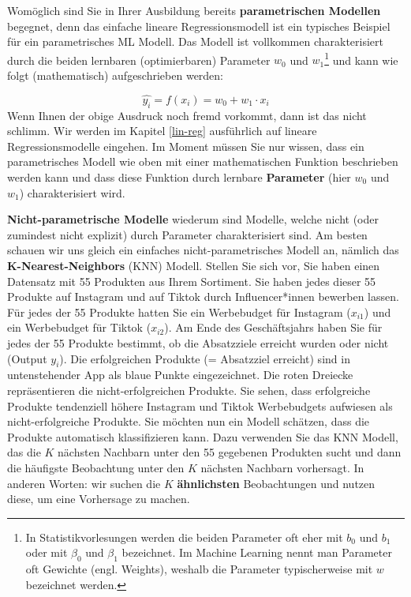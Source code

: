 \documentclass[
]{book}
\begin{document}
Womöglich sind Sie in Ihrer Ausbildung bereits \textbf{parametrischen Modellen} begegnet, denn das einfache lineare Regressionsmodell ist ein typisches Beispiel für ein parametrisches ML Modell. Das Modell ist vollkommen charakterisiert durch die beiden lernbaren (optimierbaren) Parameter \(w_0\) und \(w_1\)\footnote{In Statistikvorlesungen werden die beiden Parameter oft eher mit \(b_0\) und \(b_1\) oder mit \(\beta_0\) und \(\beta_1\) bezeichnet. Im Machine Learning nennt man Parameter oft Gewichte (engl. Weights), weshalb die Parameter typischerweise mit \(w\) bezeichnet werden.} und kann wie folgt (mathematisch) aufgeschrieben werden:

\[
\hat{y_i} = f(x_i)=w_0 + w_1 \cdot x_i
\]
Wenn Ihnen der obige Ausdruck noch fremd vorkommt, dann ist das nicht schlimm. Wir werden im Kapitel \ref{lin-reg} ausführlich auf lineare Regressionsmodelle eingehen. Im Moment müssen Sie nur wissen, dass ein parametrisches Modell wie oben mit einer mathematischen Funktion beschrieben werden kann und dass diese Funktion durch lernbare \textbf{Parameter} (hier \(w_0\) und \(w_1\)) charakterisiert wird.

\textbf{Nicht-parametrische Modelle} wiederum sind Modelle, welche nicht (oder zumindest nicht explizit) durch Parameter charakterisiert sind. Am besten schauen wir uns gleich ein einfaches nicht-parametrisches Modell an, nämlich das \textbf{K-Nearest-Neighbors} (KNN) Modell. Stellen Sie sich vor, Sie haben einen Datensatz mit 55 Produkten aus Ihrem Sortiment. Sie haben jedes dieser 55 Produkte auf Instagram und auf Tiktok durch Influencer*innen bewerben lassen. Für jedes der 55 Produkte hatten Sie ein Werbebudget für Instagram (\(x_{i1}\)) und ein Werbebudget für Tiktok (\(x_{i2}\)). Am Ende des Geschäftsjahrs haben Sie für jedes der 55 Produkte bestimmt, ob die Absatzziele erreicht wurden oder nicht (Output \(y_i\)). Die erfolgreichen Produkte (= Absatzziel erreicht) sind in untenstehender App als blaue Punkte eingezeichnet. Die roten Dreiecke repräsentieren die nicht-erfolgreichen Produkte. Sie sehen, dass erfolgreiche Produkte tendenziell höhere Instagram und Tiktok Werbebudgets aufwiesen als nicht-erfolgreiche Produkte. Sie möchten nun ein Modell schätzen, dass die Produkte automatisch klassifizieren kann. Dazu verwenden Sie das KNN Modell, das die \(K\) nächsten Nachbarn unter den 55 gegebenen Produkten sucht und dann die häufigste Beobachtung unter den \(K\) nächsten Nachbarn vorhersagt. In anderen Worten: wir suchen die \(K\) \textbf{ähnlichsten} Beobachtungen und nutzen diese, um eine Vorhersage zu machen.
\end{document}
